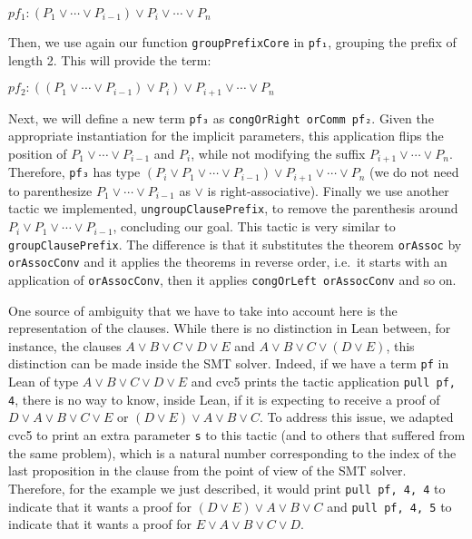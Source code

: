 \begin{center}
  $pf_{1} : (P_{1} \vee \cdots \vee P_{i - 1}) \vee P_{i} \vee \cdots \vee P_{n}$
\end{center}

Then, we use again our function \texttt{groupPrefixCore} in \texttt{pf₁}, grouping the prefix of length 2. This will provide the term:

\begin{center}
  $pf_{2} : ((P_{1} \vee \cdots \vee P_{i - 1}) \vee P_{i}) \vee P_{i + 1} \vee \cdots \vee P_{n}$
\end{center}

Next, we will define a new term \texttt{pf₃} as \texttt{congOrRight orComm pf₂}. Given the appropriate instantiation for the implicit parameters,
this application flips the position of $P_{1} \vee \cdots \vee P_{i - 1}$ and $P_{i}$, while not modifying the suffix $P_{i + 1} \vee \cdots \vee P_{n}$.
Therefore, \texttt{pf₃} has type $(P_{i} \vee P_{1} \vee \cdots \vee P_{i - 1}) \vee P_{i + 1} \vee \cdots \vee P_{n}$ (we do not need to parenthesize
$P_{1} \vee \cdots \vee P_{i - 1}$ as $\vee$ is right-associative). Finally we use another tactic we implemented, \texttt{ungroupClausePrefix},
to remove the parenthesis around $P_{i} \vee P_{1} \vee \cdots \vee P_{i - 1}$, concluding our goal.
This tactic is very similar to \texttt{groupClausePrefix}. The
difference is that it substitutes the theorem \texttt{orAssoc} by \texttt{orAssocConv} and it applies the theorems in reverse order, i.e.\ it
starts with an application of \texttt{orAssocConv}, then it applies \texttt{congOrLeft orAssocConv} and so on.

One source of ambiguity that we have to take into account here is the representation of the clauses.
While there is no distinction in Lean between, for instance, the clauses $A \vee B \vee C \vee D \vee E$
and $A \vee B \vee C \vee (D \vee E)$, this distinction can be made inside the SMT solver. Indeed, if
we have a term \texttt{pf} in Lean of type $A \vee B \vee C \vee D \vee E$ and cvc5 prints the tactic
application \texttt{pull pf, 4}, there is no way to know, inside Lean, if it is expecting to receive
a proof of $D \vee A \vee B \vee C \vee E$ or $(D \vee E) \vee A \vee B \vee C$. To address this issue,
we adapted cvc5 to print an extra parameter \texttt{s} to this tactic (and to others that suffered from the same problem),
which is a natural number corresponding to the index of the last proposition in the clause from the
point of view of the SMT solver. Therefore, for the example we just described, it would print
\texttt{pull pf, 4, 4} to indicate that it wants a proof for $(D \vee E) \vee A \vee B \vee C$ and
\texttt{pull pf, 4, 5} to indicate that it wants a proof for $E \vee A \vee B \vee C \vee D$.

